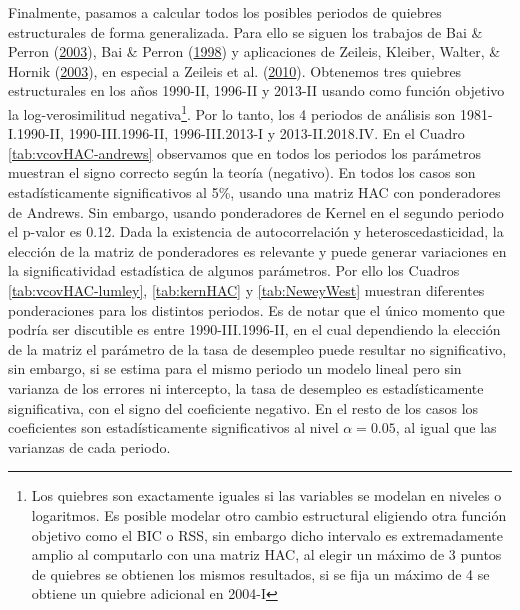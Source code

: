 \documentclass[12pt,oneside]{reedthesis}
\begin{document}
Finalmente, pasamos a calcular todos los posibles periodos de quiebres estructurales de forma generalizada. Para ello se siguen los trabajos de Bai \& Perron (\protect\hyperlink{ref-BaiPerron2003}{2003}), Bai \& Perron (\protect\hyperlink{ref-BaiPerron1998}{1998}) y aplicaciones de Zeileis, Kleiber, Walter, \& Hornik (\protect\hyperlink{ref-Zeileis2003}{2003}), en especial a Zeileis et al. (\protect\hyperlink{ref-Zeileis2010}{2010}). Obtenemos tres quiebres estructurales en los años 1990-II, 1996-II y 2013-II usando como función objetivo la log-verosimilitud negativa\footnote{Los quiebres son exactamente iguales si las variables se modelan en niveles o logaritmos. Es posible modelar otro cambio estructural eligiendo otra función objetivo como el BIC o RSS, sin embargo dicho intervalo es extremadamente amplio al computarlo con una matriz HAC, al elegir un máximo de 3 puntos de quiebres se obtienen los mismos resultados, si se fija un máximo de 4 se obtiene un quiebre adicional en 2004-I}. Por lo tanto, los 4 periodos de análisis son 1981-I.1990-II, 1990-III.1996-II, 1996-III.2013-I y 2013-II.2018.IV. En el Cuadro \ref{tab:vcovHAC-andrews} observamos que en todos los periodos los parámetros muestran el signo correcto según la teoría (negativo). En todos los casos son estadísticamente significativos al 5\%, usando una matriz HAC con ponderadores de Andrews. Sin embargo, usando ponderadores de Kernel en el segundo periodo el p-valor es 0.12. Dada la existencia de autocorrelación y heteroscedasticidad, la elección de la matriz de ponderadores es relevante y puede generar variaciones en la significatividad estadística de algunos parámetros. Por ello los Cuadros \ref{tab:vcovHAC-lumley}, \ref{tab:kernHAC} y \ref{tab:NeweyWest} muestran diferentes ponderaciones para los distintos periodos. Es de notar que el único momento que podría ser discutible es entre 1990-III.1996-II, en el cual dependiendo la elección de la matriz el parámetro de la tasa de desempleo puede resultar no significativo, sin embargo, si se estima para el mismo periodo un modelo lineal pero sin varianza de los errores ni intercepto, la tasa de desempleo es estadísticamente significativa, con el signo del coeficiente negativo. En el resto de los casos los coeficientes son estadísticamente significativos al nivel \(\alpha = 0.05\), al igual que las varianzas de cada periodo.
\end{document}
